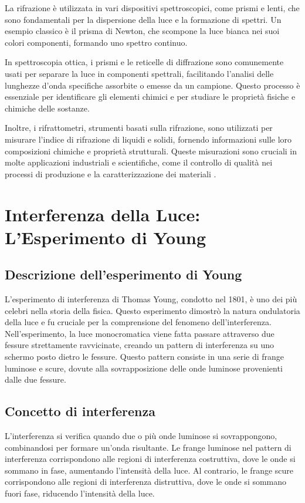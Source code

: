 \documentclass[12pt,a4paper]{report}
\begin{document}
La rifrazione è utilizzata in vari dispositivi spettroscopici, come prismi e lenti, che sono fondamentali per la dispersione della luce e la formazione di spettri. Un esempio classico è il prisma di Newton, che scompone la luce bianca nei suoi colori componenti, formando uno spettro continuo.

In spettroscopia ottica, i prismi e le reticelle di diffrazione sono comunemente usati per separare la luce in componenti spettrali, facilitando l'analisi delle lunghezze d'onda specifiche assorbite o emesse da un campione. Questo processo è essenziale per identificare gli elementi chimici e per studiare le proprietà fisiche e chimiche delle sostanze.

Inoltre, i rifrattometri, strumenti basati sulla rifrazione, sono utilizzati per misurare l'indice di rifrazione di liquidi e solidi, fornendo informazioni sulle loro composizioni chimiche e proprietà strutturali. Queste misurazioni sono cruciali in molte applicazioni industriali e scientifiche, come il controllo di qualità nei processi di produzione e la caratterizzazione dei materiali \cite{hecht2002optics}.

\section{Interferenza della Luce: L'Esperimento di Young}

\subsection{Descrizione dell'esperimento di Young}

L'esperimento di interferenza di Thomas Young, condotto nel 1801, è uno dei più celebri nella storia della fisica. Questo esperimento dimostrò la natura ondulatoria della luce e fu cruciale per la comprensione del fenomeno dell'interferenza. Nell'esperimento, la luce monocromatica viene fatta passare attraverso due fessure strettamente ravvicinate, creando un pattern di interferenza su uno schermo posto dietro le fessure. Questo pattern consiste in una serie di frange luminose e scure, dovute alla sovrapposizione delle onde luminose provenienti dalle due fessure.

\subsection{Concetto di interferenza}

L'interferenza si verifica quando due o più onde luminose si sovrappongono, combinandosi per formare un'onda risultante. Le frange luminose nel pattern di interferenza corrispondono alle regioni di interferenza costruttiva, dove le onde si sommano in fase, aumentando l'intensità della luce. Al contrario, le frange scure corrispondono alle regioni di interferenza distruttiva, dove le onde si sommano fuori fase, riducendo l'intensità della luce.
\end{document}
